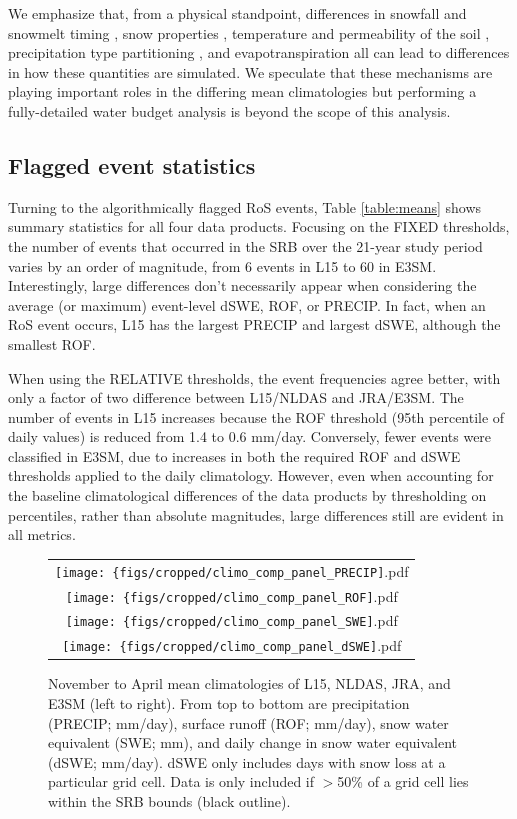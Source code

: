 \documentclass[nhess, manuscript]{copernicus}
\begin{document}
We emphasize that, from a physical standpoint, differences in snowfall and snowmelt timing \citep{rauscher2008future,mccabe2005trends}, snow properties \citep{brown2006evaluation}, temperature and permeability of the soil \citep{niu2006effects}, precipitation type partitioning \citep{knowles2006trends}, and evapotranspiration \citep{zheng2019on} all can lead to differences in how these quantities are simulated. 
We speculate that these mechanisms are playing important roles in the differing mean climatologies but performing a fully-detailed water budget analysis is beyond the scope of this analysis.

\subsection{Flagged event statistics}

Turning to the algorithmically flagged RoS events, Table \ref{table:means} shows summary statistics for all four data products. 
Focusing on the FIXED thresholds, the number of events that occurred in the SRB over the 21-year study period varies by an order of magnitude, from 6 events in L15 to 60 in E3SM.
Interestingly, large differences don't necessarily appear when considering the average (or maximum) event-level dSWE, ROF, or PRECIP. 
In fact, when an RoS event occurs, L15 has the largest PRECIP and largest dSWE, although the smallest ROF.

When using the RELATIVE thresholds, the event frequencies agree better, with only a factor of two difference between L15/NLDAS and JRA/E3SM. 
The number of events in L15 increases because the ROF threshold (95th percentile of daily values) is reduced from 1.4 to 0.6 mm/day. 
Conversely, fewer events were classified in E3SM, due to increases in both the required ROF and dSWE thresholds applied to the daily climatology. 
However, even when accounting for the baseline climatological differences of the data products by thresholding on percentiles, rather than absolute magnitudes, large differences still are evident in all metrics.

\begin{figure}
\begin{tabular}{c}
\texttt{[image: \{figs/cropped/climo\_comp\_panel\_PRECIP]}.pdf} \\
\texttt{[image: \{figs/cropped/climo\_comp\_panel\_ROF]}.pdf} \\
\texttt{[image: \{figs/cropped/climo\_comp\_panel\_SWE]}.pdf} \\
\texttt{[image: \{figs/cropped/climo\_comp\_panel\_dSWE]}.pdf}
\end{tabular}
\caption{November to April mean climatologies of L15, NLDAS, JRA, and E3SM (left to right). From top to bottom are precipitation (PRECIP; mm/day), surface runoff (ROF; mm/day), snow water equivalent (SWE; mm), and daily change in snow water equivalent (dSWE; mm/day). dSWE only includes days with snow loss at a particular grid cell. Data is only included if $>$50\% of a grid cell lies within the SRB bounds (black outline).}
\label{fig:means}
\end{figure}
\end{document}
